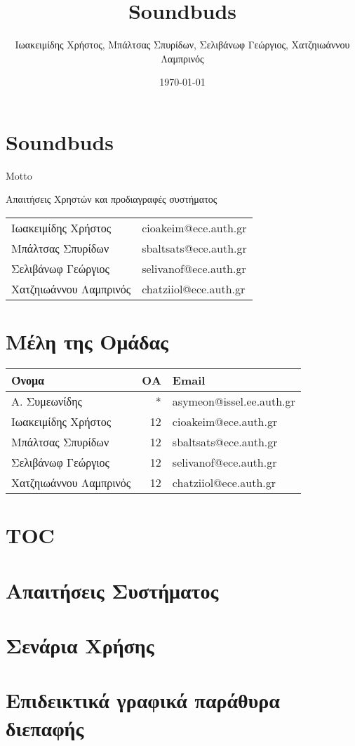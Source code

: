 \documentclass[11pt]{article}
\author{Ιωακειμίδης Χρήστος, Μπάλτσας Σπυρίδων, Σελιβάνωφ Γεώργιος, Χατζηιωάννου Λαμπρινός}
\date{\today}
\title{Soundbuds}
\begin{document}
\maketitle
\tableofcontents

\section{Soundbuds}
\label{sec:org4581e4c}
Motto

Απαιτήσεις Χρηστών και προδιαγραφές συστήματος

\begin{center}
\begin{tabular}{ll}
Ιωακειμίδης Χρήστος & cioakeim@ece.auth.gr\\[0pt]
Μπάλτσας Σπυρίδων & sbaltsats@ece.auth.gr\\[0pt]
Σελιβάνωφ Γεώργιος & selivanof@ece.auth.gr\\[0pt]
Χατζηιωάννου Λαμπρινός & chatziiol@ece.auth.gr\\[0pt]
\end{tabular}
\end{center}
\section{Μέλη της Ομάδας}
\label{sec:org75be50d}
\begin{center}
\begin{tabular}{lrl}
Όνομα & ΟΑ & Email\\[0pt]
\hline
Α. Συμεωνίδης & * & asymeon@issel.ee.auth.gr\\[0pt]
Ιωακειμίδης Χρήστος & 12 & cioakeim@ece.auth.gr\\[0pt]
Μπάλτσας Σπυρίδων & 12 & sbaltsats@ece.auth.gr\\[0pt]
Σελιβάνωφ Γεώργιος & 12 & selivanof@ece.auth.gr\\[0pt]
Χατζηιωάννου Λαμπρινός & 12 & chatziiol@ece.auth.gr\\[0pt]
\end{tabular}
\end{center}
\section{TOC}
\label{sec:org70c408a}

\section{Απαιτήσεις Συστήματος}
\label{sec:orgb28b7a1}

\section{Σενάρια Χρήσης}
\label{sec:org868711f}

\section{Επιδεικτικά γραφικά παράθυρα διεπαφής}
\label{sec:orgfb03d7c}
\end{document}
